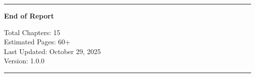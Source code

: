 \documentclass[12pt,a4paper]{report}
\begin{document}
\vfill

\begin{center}
\rule{0.3\textwidth}{0.4pt}

\textbf{End of Report}

Total Chapters: 15 \\
Estimated Pages: 60+ \\
Last Updated: October 29, 2025 \\
Version: 1.0.0

\rule{0.3\textwidth}{0.4pt}
\end{center}
\end{document}
